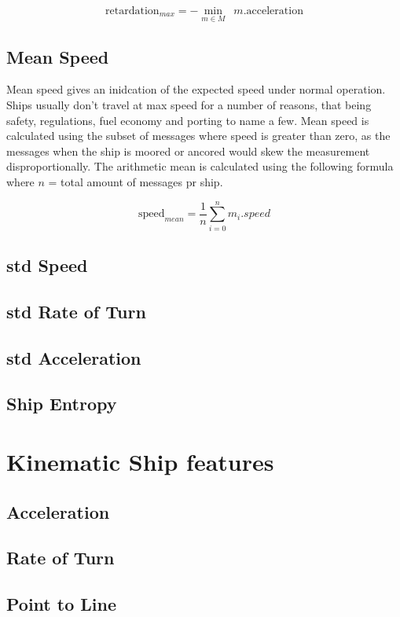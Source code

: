 $$
\mathrm{retardation}_{max} = - \min_{m \in M}\;\:{m.\mathrm{acceleration}}
$$

\subsection{Mean Speed}
Mean speed gives an inidcation of the expected speed under normal operation. Ships usually don't travel at max speed for a number of reasons, that being safety, regulations, fuel economy and porting to name a few. Mean speed is calculated using the subset of messages where speed is greater than zero, as the messages when the ship is moored or ancored would skew the measurement disproportionally. The arithmetic mean is calculated using the following formula where $n$ = total amount of messages pr ship. 

$$
\mathrm{speed}_{mean} = \dfrac{1}{n}\sum_{i=0}^{n}{m_i.speed}
$$

\subsection{std Speed}
\subsection{std Rate of Turn}
\subsection{std Acceleration}
\subsection{Ship Entropy}



\section{Kinematic Ship features}
\begin{info}{}
\end{info}

\subsection{Acceleration}
\subsection{Rate of Turn}
\subsection{Point to Line}
